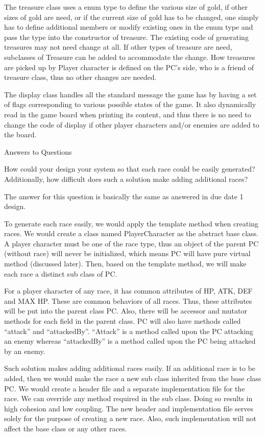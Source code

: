 \documentclass[11pt]{article}
\theoremstyle{plain} \newtheorem{theorem*}{Theorem}[subsection]
\begin{document}
The treasure class uses a enum type to define the various size of gold, if
other sizes of gold are need, or if the current size of gold has to be changed,
one simply has to define additional members or modify existing ones in the enum
type and pass the type into the constructor of treasure. The existing code of
generating treasures may not need change at all. If other types of treasure are
need, subclasses of Treasure can be added to accommodate the change. How
treasures are picked up by Player character is defined on the PC’s side, who is
a friend of treasure class, thus no other changes are needed. 

The display class handles all the standard message the game has by having a set
of flags corresponding to various possible states of the game. It also
dynamically read in the game board when printing its content, and thus there is
no need to change the code of display if other player characters and/or enemies
are added to the board.  


Answers to Questions 

How could your design your system so that each race could be easily generated?
Additionally, how difficult does such a solution make adding additional races? 

The answer for this question is basically the same as answered in due date 1
design. 

To generate each race easily, we would apply the template method when creating
races. We would create a class named PlayerCharacter as the abstract base
class. A player character must be one of the race type, thus an object of the
parent PC (without race) will never be initialized, which means PC will have
pure virtual method (discussed later). Then, based on the template method, we
will make each race a distinct sub class of PC.  

For a player character of any race, it has common attributes of HP, ATK, DEF
and MAX HP. These are common behaviors of all races. Thus, these attributes
will be put into the parent class PC. Also, there will be accessor and mutator
methods for each field in the parent class. PC will also have methods called
“attack” and “attackedBy”. “Attack” is a method called upon the PC attacking an
enemy whereas “attackedBy” is a method called upon the PC being attacked by an
enemy. 

Such solution makes adding additional races easily. If an additional race is to
be added, then we would make the race a new sub class inherited from the base
class PC. We would create a header file and a separate implementation file for
the race. We can override any method required in the sub class. Doing so
results in high cohesion and low coupling. The new header and implementation
file serves solely for the purpose of creating a new race. Also, such
implementation will not affect the base class or any other races. 
\end{document}
